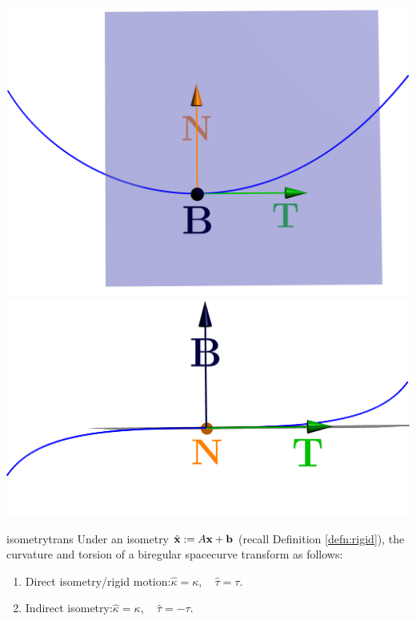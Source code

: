 \begin{center}
\href{http://www.math.uci.edu/~ndonalds/math162a/frenet-helixstill3.html}{
	\includegraphics[scale=0.12]{frenet-helixstill3.png}
	\qquad
	\includegraphics[scale=0.18]{frenet-helixstill3a.png}
	}
\end{center}

\clearpage


\begin{thm}{}{isometrytrans}
Under an isometry $\hat{{\mathbf{x}}}:=A{\mathbf{x}}+{\mathbf{b}}$ (recall Definition \ref{defn:rigid}), the curvature and torsion of a biregular spacecurve transform as follows:
\begin{enumerate}
\item[]Direct isometry/rigid motion:\quad $\hat{\kappa}=\kappa,\quad\hat{\tau}=\tau$.
\item[]Indirect isometry:\quad $\hat{\kappa}=\kappa,\quad\hat{\tau}=-\tau$.
\end{enumerate}
\end{thm}

